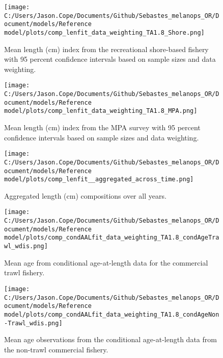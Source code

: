\documentclass[11pt,
  english,
  letterpaper,
]{article}
\begin{document}
\newpage

\begin{figure}
\centering
\texttt{[image: C:/Users/Jason.Cope/Documents/Github/Sebastes\_melanops\_OR/Document/models/Reference model/plots/comp\_lenfit\_data\_weighting\_TA1.8\_Shore.png]}
\caption{Mean length (cm) index from the recreational shore-based fishery with 95 percent confidence intervals based on sample sizes and data weighting.\label{fig:shore-mean-len-fit}}
\end{figure}

\newpage

\begin{figure}
\centering
\texttt{[image: C:/Users/Jason.Cope/Documents/Github/Sebastes\_melanops\_OR/Document/models/Reference model/plots/comp\_lenfit\_data\_weighting\_TA1.8\_MPA.png]}
\caption{Mean length (cm) index from the MPA survey with 95 percent confidence intervals based on sample sizes and data weighting.\label{fig:mpa-mean-len-fit}}
\end{figure}

\newpage

\begin{figure}
\centering
\texttt{[image: C:/Users/Jason.Cope/Documents/Github/Sebastes\_melanops\_OR/Document/models/Reference model/plots/comp\_lenfit\_\_aggregated\_across\_time.png]}
\caption{Aggregated length (cm) compositions over all years.\label{fig:agg-len-fit}}
\end{figure}

\newpage

\begin{figure}
\centering
\texttt{[image: C:/Users/Jason.Cope/Documents/Github/Sebastes\_melanops\_OR/Document/models/Reference model/plots/comp\_condAALfit\_data\_weighting\_TA1.8\_condAgeTrawl\_wdis.png]}
\caption{Mean age from conditional age-at-length data for the commercial trawl fishery.\label{fig:trawl-mean-caal}}
\end{figure}

\newpage

\begin{figure}
\centering
\texttt{[image: C:/Users/Jason.Cope/Documents/Github/Sebastes\_melanops\_OR/Document/models/Reference model/plots/comp\_condAALfit\_data\_weighting\_TA1.8\_condAgeNon-Trawl\_wdis.png]}
\caption{Mean age observations from the conditional age-at-length data from the non-trawl commercial fishery.\label{fig:nontrawl-mean-caal}}
\end{figure}
\end{document}

